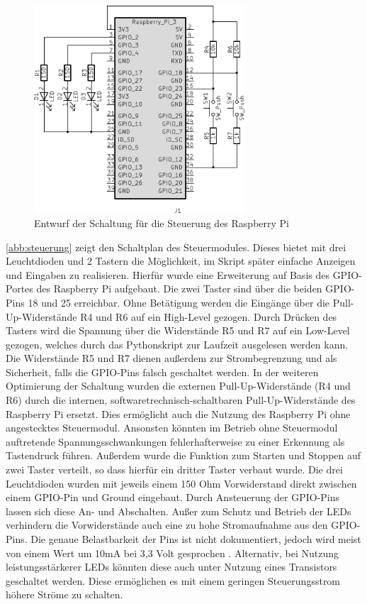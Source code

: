 \documentclass[a4paper,12pt,bibliography=totoc, listof=totoc,titlepage,pointlessnumbers]{scrreprt}
\begin{document}
\begin{figure}[!ht]
 \centering
 \includegraphics[width=0.7\textwidth]{img/schaltplanRasp.pdf}
 \caption{Entwurf der Schaltung für die Steuerung des Rasp\-berry Pi}
 \label{abb:steuerung}
\end{figure}

\autoref{abb:steuerung} zeigt den Schaltplan des Steuermodules. Dieses bietet mit drei Leuchtdioden und 2 Tastern die Möglichkeit, im Skript später einfache Anzeigen und Eingaben zu realisieren. Hierfür wurde eine Erweiterung auf Basis des GPIO-Portes des Rasp\-berry Pi aufgebaut. Die zwei Taster sind über die beiden GPIO-Pins 18 und 25 erreichbar. Ohne Betätigung werden die Eingänge über die Pull-Up-Widerstände R4 und R6 auf ein High-Level gezogen. Durch Drücken des Tasters wird die Spannung über die Widerstände R5 und R7 auf ein Low-Level gezogen, welches durch das Pythonskript zur Laufzeit ausgelesen werden kann. Die Widerstände R5 und R7 dienen außerdem zur Strombegrenzung und als Sicherheit, falls die GPIO-Pins falsch geschaltet werden.
In der weiteren Optimierung der Schaltung wurden die externen Pull-Up-Widerstände (R4 und R6) durch die internen, softwaretrechnisch-schaltbaren Pull-Up-Widerstände des Raspberry Pi ersetzt. Dies ermöglicht auch die Nutzung des Raspberry Pi ohne angestecktes Steuermodul. Ansonsten könnten im Betrieb ohne Steuermodul auftretende Spannungsschwankungen fehlerhafterweise zu einer Erkennung als Tastendruck führen. Außerdem wurde die Funktion zum Starten und Stoppen auf zwei Taster verteilt, so dass hierfür ein dritter Taster verbaut wurde.
Die drei Leuchtdioden wurden mit jeweils einem 150 Ohm Vorwiderstand direkt zwischen einem GPIO-Pin und Ground eingebaut. Durch Ansteuerung der GPIO-Pins lassen sich diese An- und Abschalten. Außer zum Schutz und Betrieb der LEDs verhindern die Vorwiderstände auch eine zu hohe Stromaufnahme aus den GPIO-Pins. Die genaue Belastbarkeit der Pins ist nicht dokumentiert, jedoch wird meist von einem Wert um 10mA bei 3,3 Volt gesprochen \citep[zum Beispiel][]{ekRaspPin}. Alternativ, bei Nutzung leistungsstärkerer LEDs könnten diese auch unter Nutzung eines Transistors geschaltet werden. Diese ermöglichen es mit einem geringen Steuerungsstrom höhere Ströme zu schalten.
\end{document}
